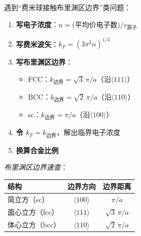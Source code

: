 \begin{thinkbox}
遇到``费米球接触布里渊区边界''类问题：
\begin{enumerate}
    \item \textbf{写电子浓度}：$n = $(平均价电子数)$/v_{\text{原子}}$
    \item \textbf{写费米波矢}：$k_F = (3\pi^{2}n)^{1/3}$
    \item \textbf{写布里渊区边界}：
    \begin{itemize}
        \item FCC：$k_{\text{边界}} = \sqrt{3}\,\pi/a$（沿$\langle 111\rangle$）
        \item BCC：$k_{\text{边界}} = \sqrt{2}\,\pi/a$（沿$\langle 110\rangle$）
        \item sc：$k_{\text{边界}} = \pi/a$（沿$\langle 100\rangle$）
    \end{itemize}
    \item \textbf{令 $k_F = k_{\text{边界}}$}，解出临界电子浓度
    \item \textbf{换算合金比例}
\end{enumerate}

\textit{布里渊区边界速查}：
\begin{center}
\begin{tabular}{lcc}
\toprule
\textbf{结构} & \textbf{边界方向} & \textbf{边界距离} \\
\midrule
简立方（sc） & $\langle 100\rangle$ & $\pi/a$ \\
面心立方（fcc） & $\langle 111\rangle$ & $\sqrt{3}\,\pi/a$ \\
体心立方（bcc） & $\langle 110\rangle$ & $\sqrt{2}\,\pi/a$ \\
\bottomrule
\end{tabular}
\end{center}
\end{thinkbox}
